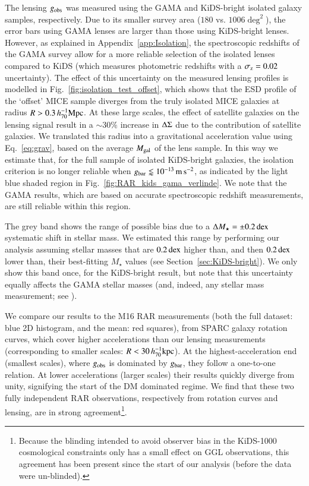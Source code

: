\documentclass{aa}
\newcommand{\hkpc}{\,h_{70}^{-1}{\rm{kpc}} }
\newcommand{\hMpc}{\,h_{70}^{-1}{\rm{Mpc}} }
\newcommand{\mpss}{\,{\rm m}\,{\rm s}^{-2} }
\newcommand{\dex}{\,{\rm dex}}
\renewcommand{\Upsigma}{{\rm \Sigma}}
\renewcommand{\Updelta}{{\rm \Delta}}
\newcommand{\un}[1]{_{\rm #1}}
\begin{document}
The lensing $g\un{obs}$ was measured using the GAMA and KiDS-bright isolated galaxy samples, respectively. Due to its smaller survey area ($180$ vs. $1006 \deg^2$), the error bars using GAMA lenses are larger than those using KiDS-bright lenses. However, as explained in Appendix~\ref{app:Isolation}, the spectroscopic redshifts of the GAMA survey allow for a more reliable selection of the isolated lenses compared to KiDS (which measures photometric redshifts with a $\sigma\un{z}=0.02$ uncertainty). The effect of this uncertainty on the measured lensing profiles is modelled in Fig.~\ref{fig:isolation_test_offset}, which shows that the ESD profile of the `offset' MICE sample diverges from the truly isolated MICE galaxies at radius $R > 0.3 \hMpc$. At these large scales, the effect of satellite galaxies on the lensing signal result in a $\sim30\%$ increase in $\Updelta\Upsigma$ due to the contribution of satellite galaxies. We translated this radius into a gravitational acceleration value using Eq.~\ref{eq:grav}, based on the average $M\un{gal}$ of the lens sample. In this way we estimate that, for the full sample of isolated KiDS-bright galaxies, the isolation criterion is no longer reliable when $g\un{bar} \lessapprox 10^{-13} \mpss$, as indicated by the light blue shaded region in Fig.~\ref{fig:RAR_kids_gama_verlinde}. We note that the GAMA results, which are based on accurate spectroscopic redshift measurements, are still reliable within this region.

The grey band shows the range of possible bias due to a $\Updelta M_\star=\pm0.2 \dex$ systematic shift in stellar mass. We estimated this range by performing our analysis assuming stellar masses that are $0.2 \dex$ higher than, and then $0.2 \dex$ lower than, their best-fitting $M_\star$ values (see Section~\ref{sec:KiDS-bright}). We only show this band once, for the KiDS-bright result, but note that this uncertainty equally affects the GAMA stellar masses (and, indeed, any stellar mass measurement; see \citealt{wright2017}).

We compare our results to the M16 RAR measurements (both the full dataset: blue 2D histogram, and the mean: red squares), from SPARC galaxy rotation curves, which cover higher accelerations than our lensing measurements (corresponding to smaller scales: $R < 30 \hkpc$). At the highest-acceleration end (smallest scales), where $g\un{obs}$ is dominated by $g\un{bar}$, they follow a one-to-one relation. At lower accelerations (larger scales) their results quickly diverge from unity, signifying the start of the DM dominated regime. We find that these two fully independent RAR observations, respectively from rotation curves and lensing, are in strong agreement\footnote{Because the blinding intended to avoid observer bias in the KiDS-1000 cosmological constraints \cite[]{asgari2020,heymans2020,troster2020} only has a small effect on GGL observations, this agreement has been present since the start of our analysis (before the data were un-blinded).}.
\end{document}
